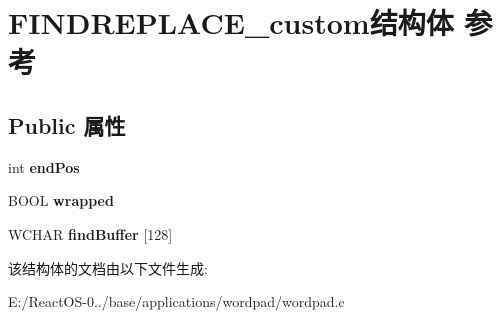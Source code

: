 \hypertarget{struct_f_i_n_d_r_e_p_l_a_c_e__custom}{}\section{F\+I\+N\+D\+R\+E\+P\+L\+A\+C\+E\+\_\+custom结构体 参考}
\label{struct_f_i_n_d_r_e_p_l_a_c_e__custom}
\subsection*{Public 属性}
\begin{DoxyCompactItemize}
\item 
\mbox{\label{struct_f_i_n_d_r_e_p_l_a_c_e__custom_ac2fb6c9937e02481be7d388574511cf6}} 
int {\bfseries end\+Pos}
\item 
\mbox{\label{struct_f_i_n_d_r_e_p_l_a_c_e__custom_a9afe32c6c7cb7a496ec8c1923b9c2010}} 
B\+O\+OL {\bfseries wrapped}
\item 
\mbox{\label{struct_f_i_n_d_r_e_p_l_a_c_e__custom_ad5553611bfa4de897e1a55413f3c601e}} 
W\+C\+H\+AR {\bfseries find\+Buffer} \mbox{[}128\mbox{]}
\end{DoxyCompactItemize}


该结构体的文档由以下文件生成\+:\begin{DoxyCompactItemize}
\item 
E\+:/\+React\+O\+S-\/0../base/applications/wordpad/wordpad.\+c\end{DoxyCompactItemize}
